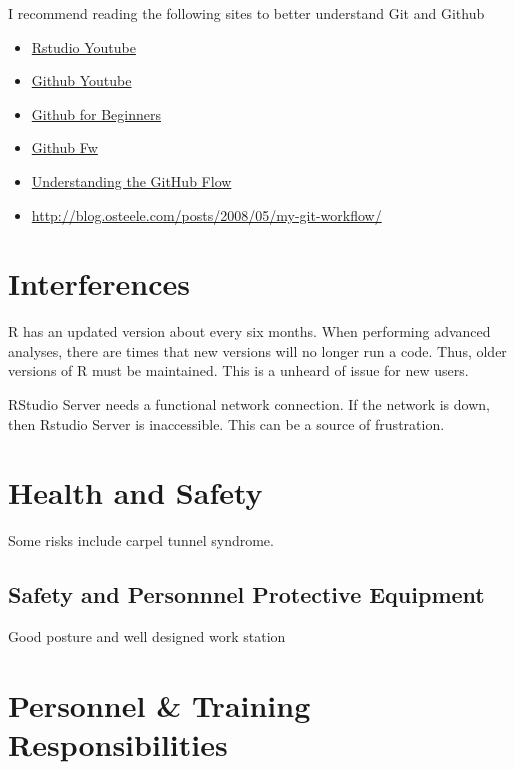 \documentclass[12pt]{../SOP3_beta}
\begin{document}
\NP I recommend reading the following sites to better understand Git and Github

\begin{itemize}
  \item \href{https://www.youtube.com/watch?v=uHYcDQDbMY8}{Rstudio Youtube}
  \item \href{https://www.youtube.com/watch?v=0fKg7e37bQE}{Github Youtube}
  \item \href{http://product.hubspot.com/blog/git-and-github-tutorial-for-beginners}{Github for Beginners}
  \item \href{http://scottchacon.com/2011/08/31/github-flow.html}{Github Fw}
  \item \href{https://guides.github.com/introduction/flow/}{Understanding the GitHub Flow}
  \item \href{http://blog.osteele.com/posts/2008/05/my-git-workflow/}{http://blog.osteele.com/posts/2008/05/my-git-workflow/}
  
\end{itemize}


\section{Interferences}

\NP R has an updated version about every six months. When performing advanced analyses, there are times that new versions will no longer run a code. Thus, older versions of R must be maintained. This is a unheard of issue for new users.

\NP RStudio Server needs a functional network connection. If the network is down, then Rstudio Server is inaccessible. This can be a source of frustration. 

\section{Health and Safety}

\NP Some risks include carpel tunnel syndrome. 


\subsection*{Safety and Personnnel Protective Equipment}

\NP Good posture and well designed work station

\section{Personnel \& Training Responsibilities}
\end{document}
